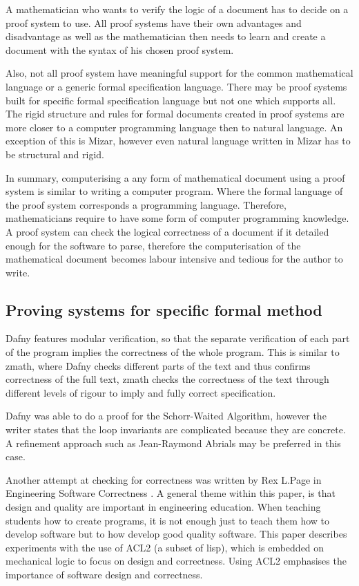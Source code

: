 A mathematician who wants to verify the logic of a document has to decide on a proof system to use. All proof systems have their own advantages and disadvantage as well as the mathematician then needs to learn and create a document with the syntax of his chosen proof system.

Also, not all proof system have meaningful support for the common mathematical language or a generic formal specification language. There may be proof systems built for specific formal specification language but not one which supports all. The rigid structure and rules for formal documents created in proof systems are more closer to a computer programming language then to natural language. An exception of this is Mizar, however even natural language written in Mizar has to be structural and rigid.

In summary, computerising a any form of mathematical document using a proof system is similar to writing a computer program. Where the formal language of the proof system corresponds a programming language. Therefore, mathematicians require to have some form of computer programming knowledge. A proof system can check the logical correctness of a document if it detailed enough for the software to parse, therefore the computerisation of the mathematical document becomes labour intensive and tedious for the author to write.

\subsection{Proving systems for specific formal method}


Dafny \cite{dafny} features modular verification, so that the separate verification of each part of the program implies the correctness of the whole program. This is similar to \gls{zmath}, where Dafny checks different parts of the text and thus confirms correctness of the full text, \gls{zmath} checks the correctness of the text through different levels of rigour to imply and fully correct specification.

Dafny was able to do a proof for the Schorr-Waited Algorithm, however the writer states that the loop invariants are complicated because they are concrete. A refinement approach such as Jean-Raymond Abrials \cite{abrial} may be preferred in this case.  

Another attempt at checking for correctness was written by Rex L.Page in Engineering Software Correctness \cite{engineeringsoftwarecorrectness}. A general theme within this paper, is that design and quality are important in engineering education. When teaching students how to create programs, it is not enough just to teach them how to develop software but to how develop good quality software. This paper describes experiments with the use of ACL2 (a subset of lisp), which is embedded on mechanical logic to focus on design and correctness. Using ACL2 emphasises the importance of software design and correctness. 

